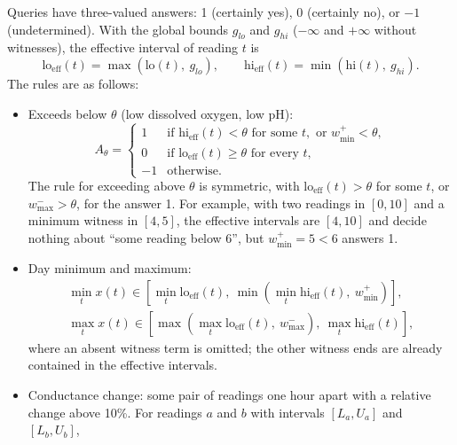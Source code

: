 Queries have three-valued answers: 1 (certainly yes), 0 (certainly no), or $-1$ (undetermined). With the global bounds $g_{lo}$ and $g_{hi}$ ($-\infty$ and $+\infty$ without witnesses), the effective interval of reading $t$ is
\begin{equation}
\mathrm{lo}_\mathrm{eff}(t) = \max(\mathrm{lo}(t),\ g_{lo}), \qquad \mathrm{hi}_\mathrm{eff}(t) = \min(\mathrm{hi}(t),\ g_{hi}).
\label{eq:eff}
\end{equation}
The rules are as follows:
\begin{itemize}
  \item Exceeds below $\theta$ (low dissolved oxygen, low pH):
  \begin{equation}
  A_\theta =
  \begin{cases}
  1 & \text{if } \mathrm{hi}_\mathrm{eff}(t) < \theta \text{ for some } t, \text{ or } w^{+}_{\min} < \theta,\\
  0 & \text{if } \mathrm{lo}_\mathrm{eff}(t) \ge \theta \text{ for every } t,\\
  -1 & \text{otherwise.}
  \end{cases}
  \label{eq:rule}
  \end{equation}
  The rule for exceeding above $\theta$ is symmetric, with $\mathrm{lo}_\mathrm{eff}(t) > \theta$ for some $t$, or $w^{-}_{\max} > \theta$, for the answer 1. For example, with two readings in $[0, 10]$ and a minimum witness in $[4, 5]$, the effective intervals are $[4, 10]$ and decide nothing about ``some reading below 6'', but $w^{+}_{\min} = 5 < 6$ answers 1.
  \item Day minimum and maximum:
  \begin{equation}
  \begin{gathered}
  \min_t x(t) \in \left[\min_t \mathrm{lo}_\mathrm{eff}(t),\ \min\!\left(\min_t \mathrm{hi}_\mathrm{eff}(t),\ w^{+}_{\min}\right)\right],\\
  \max_t x(t) \in \left[\max\!\left(\max_t \mathrm{lo}_\mathrm{eff}(t),\ w^{-}_{\max}\right),\ \max_t \mathrm{hi}_\mathrm{eff}(t)\right],
  \end{gathered}
  \label{eq:extrema}
  \end{equation}
  where an absent witness term is omitted; the other witness ends are already contained in the effective intervals.
  \item Conductance change: some pair of readings one hour apart with a relative change above 10\%. For readings $a$ and $b$ with intervals $[L_a, U_a]$ and $[L_b, U_b]$,
  \begin{equation}

\end{equation}
\end{itemize}
